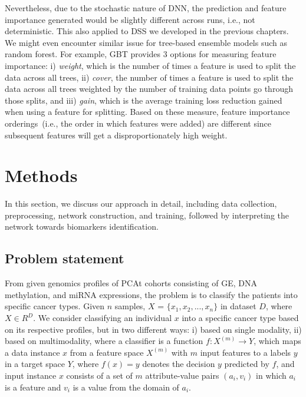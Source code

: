 
\hspace*{3.5mm} Nevertheless, due to the stochastic nature of DNN, the prediction and feature importance generated would be slightly different across runs, i.e., not deterministic. This also applied to DSS we developed in the previous chapters. We might even encounter similar issue for tree-based ensemble models such as random forest. For example, GBT provides 3 options for measuring feature importance: i) \emph{weight}, which is the number of times a feature is used to split the data across all trees, ii) \emph{cover}, the number of times a feature is used to split the data across all trees weighted by the number of training data points go through those splits, and iii) \emph{gain}, which is the average training loss reduction gained when using a feature for splitting. Based on these measure, feature importance orderings~(i.e., the order in which features were added) are different since subsequent features will get a disproportionately high weight.

\section{Methods}\label{chapter_5:mm}
In this section, we discuss our approach in detail, including data collection, preprocessing, network construction, and training, followed by interpreting the network towards biomarkers identification. 

\subsection{Problem statement}
From given genomics profiles of PCAt cohorts consisting of GE, DNA methylation, and miRNA expressions, the problem is to classify the patients into specific cancer types. Given $n$ samples, $X$ = ${{\{x_1,x_2, ..., x_n}}\}$ in dataset $D$, where $X \in {R}^{D}$. We consider classifying an individual $x$ into a specific cancer type based on its respective profiles, but in two different ways: i) based on single modality, ii) based on multimodality, where a  classifier is a function $f: {X}^{(m)} \rightarrow {Y}$, which maps a data instance $x$ from a feature space ${X}^{(m)}$ with $m$ input features to a labels $y$ in a target space ${Y}$, where $f(x)=y$ denotes the decision $y$ predicted by $f$, and input instance $x$ consists of a set of $m$ attribute-value pairs $\left(a_{i}, v_{i}\right)$ in which $a_i$ is a feature and $v_i$ is a value from the domain of $a_i$. 

